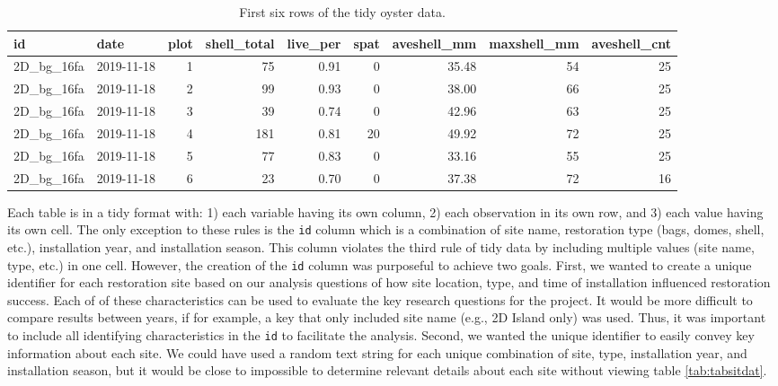 \documentclass[
]{book}
\begin{document}
\begin{table}

\caption{\label{tab:taboysdat}First six rows of the tidy oyster data.}
\centering
\begin{tabular}[t]{l|l|r|r|r|r|r|r|r}
\hline
id & date & plot & shell\_total & live\_per & spat & aveshell\_mm & maxshell\_mm & aveshell\_cnt\\
\hline
2D\_bg\_16fa & 2019-11-18 & 1 & 75 & 0.91 & 0 & 35.48 & 54 & 25\\
\hline
2D\_bg\_16fa & 2019-11-18 & 2 & 99 & 0.93 & 0 & 38.00 & 66 & 25\\
\hline
2D\_bg\_16fa & 2019-11-18 & 3 & 39 & 0.74 & 0 & 42.96 & 63 & 25\\
\hline
2D\_bg\_16fa & 2019-11-18 & 4 & 181 & 0.81 & 20 & 49.92 & 72 & 25\\
\hline
2D\_bg\_16fa & 2019-11-18 & 5 & 77 & 0.83 & 0 & 33.16 & 55 & 25\\
\hline
2D\_bg\_16fa & 2019-11-18 & 6 & 23 & 0.70 & 0 & 37.38 & 72 & 16\\
\hline
\end{tabular}
\end{table}

Each table is in a tidy format with: 1) each variable having its own column, 2) each observation in its own row, and 3) each value having its own cell. The only exception to these rules is the \texttt{id} column which is a combination of site name, restoration type (bags, domes, shell, etc.), installation year, and installation season. This column violates the third rule of tidy data by including multiple values (site name, type, etc.) in one cell. However, the creation of the \texttt{id} column was purposeful to achieve two goals. First, we wanted to create a unique identifier for each restoration site based on our analysis questions of how site location, type, and time of installation influenced restoration success. Each of of these characteristics can be used to evaluate the key research questions for the project. It would be more difficult to compare results between years, if for example, a key that only included site name (e.g., 2D Island only) was used. Thus, it was important to include all identifying characteristics in the \texttt{id} to facilitate the analysis. Second, we wanted the unique identifier to easily convey key information about each site. We could have used a random text string for each unique combination of site, type, installation year, and installation season, but it would be close to impossible to determine relevant details about each site without viewing table \ref{tab:tabsitdat}.
\end{document}
